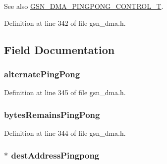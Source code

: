 \begin{DoxySeeAlso}{See also}
\hyperlink{a00645_gae146d7793ab9cfe1a37249ffc98ccf5d}{GSN\_\-DMA\_\-PINGPONG\_\-CONTROL\_\-T}. 
\end{DoxySeeAlso}


Definition at line 342 of file gsn\_\-dma.h.



\subsection{Field Documentation}
\hypertarget{a00051_ab281cce68bb01d3d53c7abb348d990fb}{
\subsubsection[{alternatePingPong}]{ {\bf alternatePingPong}}}
\label{a00051_ab281cce68bb01d3d53c7abb348d990fb}


Definition at line 345 of file gsn\_\-dma.h.

\hypertarget{a00051_a9394c38b85c47383e3bb7eed9d98a83f}{
\subsubsection[{bytesRemainsPingPong}]{ {\bf bytesRemainsPingPong}}}
\label{a00051_a9394c38b85c47383e3bb7eed9d98a83f}


Definition at line 344 of file gsn\_\-dma.h.

\hypertarget{a00051_a45a1fc7c409bf6980b896df19fc9770f}{
\subsubsection[{destAddressPingpong}]{$\ast$ {\bf destAddressPingpong}}}
\label{a00051_a45a1fc7c409bf6980b896df19fc9770f}


